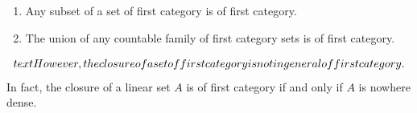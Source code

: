 \begin{enumerate}
  \item Any subset of a set of first category is of first category.
  \item The union of any countable family of first category sets is of first category.
\end{enumerate}
$$\\text{However, the closure of a set of first category is not in general of first category.}$$
In fact, the closure of a linear set $A$ is of first category if and only if $A$ is nowhere dense.
